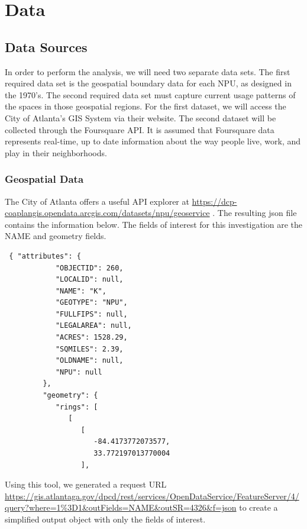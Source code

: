\documentclass[11pt]{amsart}
\begin{document}
\section{Data}
\subsection{Data Sources}
In order to perform the analysis, we will need two separate data sets. The first required data set is the geospatial boundary data for each NPU, as designed in the 1970's. The second required data set must capture current usage patterns of the spaces in those geospatial regions. For the first dataset, we will access the City of Atlanta's GIS System via their website. The second dataset will be collected through the Foursquare API. It is assumed that Foursquare data represents real-time, up to date information about the way people live, work, and play in their neighborhoods.
\subsubsection{Geospatial Data}
The City of Atlanta offers a useful API explorer at \url{https://dcp-coaplangis.opendata.arcgis.com/datasets/npu/geoservice} . The resulting json file contains the information below. The fields of interest for this investigation are the NAME and geometry fields. 

\begin{lstlisting}
 { "attributes": {
            "OBJECTID": 260,
            "LOCALID": null,
            "NAME": "K",
            "GEOTYPE": "NPU",
            "FULLFIPS": null,
            "LEGALAREA": null,
            "ACRES": 1528.29,
            "SQMILES": 2.39,
            "OLDNAME": null,
            "NPU": null
         },
         "geometry": {
            "rings": [
               [
                  [
                     -84.4173772073577,
                     33.772197013770004
                  ],
\end{lstlisting}

Using this tool, we generated a request URL \url{https://gis.atlantaga.gov/dpcd/rest/services/OpenDataService/FeatureServer/4/query?where=1%3D1&outFields=NAME&outSR=4326&f=json} to create a simplified output object with only the fields of interest. 
\end{document}
